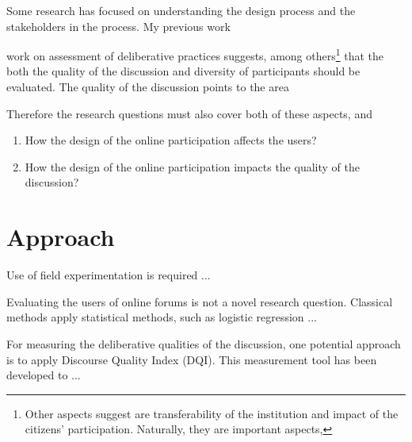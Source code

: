\documentclass[journal,a4paper]{IEEEtran}
\begin{document}
Some research has focused on understanding the design process and the stakeholders in the process. My previous work \cite{nelimarkka11}

 work on assessment of deliberative practices suggests, among others\footnote{Other aspects  suggest are transferability of the institution and impact of the citizens' participation. Naturally, they are important aspects,} that the both the quality of the discussion and diversity of participants should be evaluated. The quality of the discussion points to the area

Therefore the research questions must also cover both of these aspects, and 

\begin{enumerate}
\item How the design of the online participation affects the users?
\item How the design of the online participation impacts the quality of the discussion?
\end{enumerate}

\section{Approach}

Use of field experimentation is required ...

Evaluating the users of online forums is not a novel research question. Classical methods apply statistical methods, such as logistic regression ...

For measuring the deliberative qualities of the discussion, one potential approach is to apply  Discourse Quality Index (DQI). This measurement tool has been developed to ...



\end{document}
